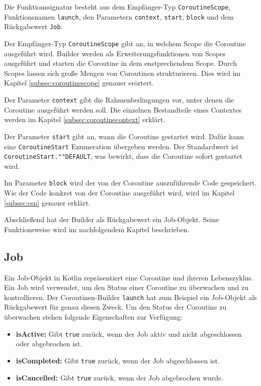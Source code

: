 \documentclass[fontsize=12pt,paper=a4,twoside=semi,parskip=half-,headsepline,headinclude]{scrreprt}
\begin{document}
Die Funktionssignatur besteht aus dem Empfänger-Typ \texttt{CoroutineScope}, Funktionsnamen \texttt{launch}, den Parametern \texttt{context}, \texttt{start}, \texttt{block} und dem Rückgabewert \texttt{Job}.

Der Empfänger-Typ \texttt{CoroutineScope} gibt an, in welchem Scope die Coroutine ausgeführt wird. Builder werden als Erweiterungsfunktionen von Scopes ausgeführt und starten die Coroutine in dem enstprechendem Scope. Durch Scopes lassen sich große Mengen von Coroutinen strukturieren. Dies wird im Kapitel \ref{subsec:coroutinescope} genauer erörtert.

Der Parameter \texttt{context} gibt die Rahmenbedingungen vor, unter denen die Coroutine ausgeführt werden soll. Die einzelnen Bestandteile eines Contextes werden im Kapitel \ref{subsec:coroutinecontext} erklärt.

Der Parameter \texttt{start} gibt an, wann die Coroutine gestartet wird. Dafür kann eine \texttt{CoroutineStart} Enumeration übergeben werden. Der Standardwert ist \texttt{CoroutineStart.""DEFAULT}, was bewirkt, dass die Coroutine sofort gestartet wird.

Im Parameter \texttt{block} wird der von der Coroutine auszuführende Code gespeichert. Wie der Code konkret von der Coroutine ausgeführt wird, wird im Kapitel \ref{subsec:csp} genauer erklärt.

Abschließend hat der Builder als Rückgabewert ein Job-Objekt. Seine Funktionsweise wird im nachfolgendem Kapitel beschrieben.


\subsection{Job}

Ein Job-Objekt in Kotlin repräsentiert eine Coroutine und ihreren Lebenszyklus. Ein Job wird verwendet, um den Status einer Coroutine zu überwachen und zu kontrollieren. Der Coroutinen-Builder \texttt{launch} hat zum Beispiel ein Job-Objekt als Rückgabewert für genau diesen Zweck. Um den Status der Coroutine zu überwachen stehen folgende Eigenschaften zur Verfügung:

\begin{itemize}
	\item \textbf{isActive:} Gibt \texttt{true} zurück, wenn der Job aktiv und nicht abgeschlossen oder abgebrochen ist.
	\item \textbf{isCompleted:} Gibt \texttt{true} zurück, wenn der Job abgeschlossen ist.
	\item \textbf{isCancelled:} Gibt \texttt{true} zurück, wenn der Job abgebrochen wurde.
\end{itemize}
\end{document}
